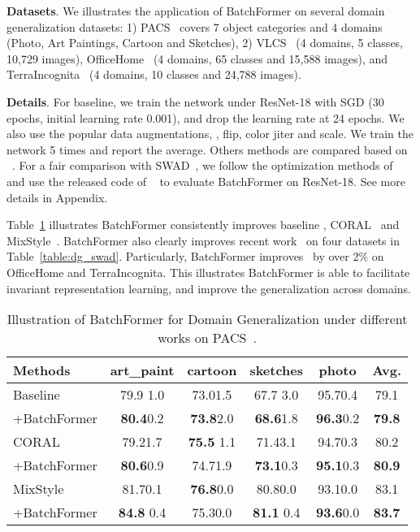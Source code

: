 \documentclass[10pt,twocolumn,letterpaper]{article}
\begin{document}
{\bf Datasets}. We illustrates the application of BatchFormer on several domain generalization datasets: 1) PACS~\cite{li2017deeper} covers 7 object categories and 4 domains (Photo, Art Paintings, Cartoon and Sketches), 2) VLCS~\cite{fang2013unbiased} (4 domains, 5 classes, 10,729 images), OfficeHome~\cite{venkateswara2017deep} (4 domains, 65 classes and 15,588 images), and TerraIncognita~\cite{beery2018recognition} (4 domains, 10 classes and 24,788 images).


{\bf Details}. For baseline, we train the network under ResNet-18 with SGD (30 epochs, initial learning rate 0.001), and drop the learning rate at 24 epochs. We also use the popular data augmentations, \eg, flip, color jiter and scale. We train the network 5 times and report the average. Others methods are compared based on ~\cite{dalib}. For a fair comparison with SWAD~\cite{cha2021swad}, we follow the optimization methods of~\cite{cha2021swad} and use the released code of ~\cite{cha2021swad} to evaluate BatchFormer on ResNet-18. See more details in Appendix.

Table~\ref{table:dg_pacs} illustrates BatchFormer consistently improves baseline , CORAL~\cite{deep_coral} and MixStyle~\cite{zhou2021mixstyle}. BatchFormer also clearly improves recent work~\cite{cha2021swad} on four datasets in Table~\ref{table:dg_swad}. Particularly, BatchFormer improves~\cite{cha2021swad} by over 2\% on OfficeHome and TerraIncognita. This illustrates BatchFormer is able to facilitate invariant representation learning, and improve the generalization across domains.

\begin{table}[tp]
\setlength\tabcolsep{2.5pt}
\small
\caption{Illustration of BatchFormer for Domain Generalization under different works on PACS~\cite{li2017deeper}.}
\label{table:dg_pacs}
\centering
\begin{tabular}{@{}lccccc@{}}
\hline
Methods  & art\_paint & cartoon & sketches & photo & Avg.  \\
\hline
Baseline &79.9 1.0 & 73.01.5 & 67.7 3.0& 95.70.4 & 79.1\\
+BatchFormer & {\bf 80.4}0.2 & {\bf 73.8}2.0& {\bf 68.6}1.8&{\bf 96.3}0.2 & {\bf 79.8}\\
\hline
CORAL~\cite{deep_coral} & 79.21.7 &  {\bf 75.5} 1.1 & 71.43.1 & 94.70.3 &  80.2 \\
+BatchFormer & {\bf 80.6}0.9 &  74.71.9 & {\bf 73.1}0.3& {\bf 95.1}0.3 & {\bf 80.9} \\
\hline
MixStyle~\cite{zhou2021mixstyle} & 81.70.1 &  {\bf 76.8}0.0 & 80.80.0 &  93.10.0 & 83.1 \\
+BatchFormer & {\bf 84.8} 0.4 &  75.30.0 &  {\bf 81.1} 0.4 & {\bf 93.6}0.0 &  {\bf 83.7}\\



\hline
\end{tabular}
\end{table}
\end{document}
